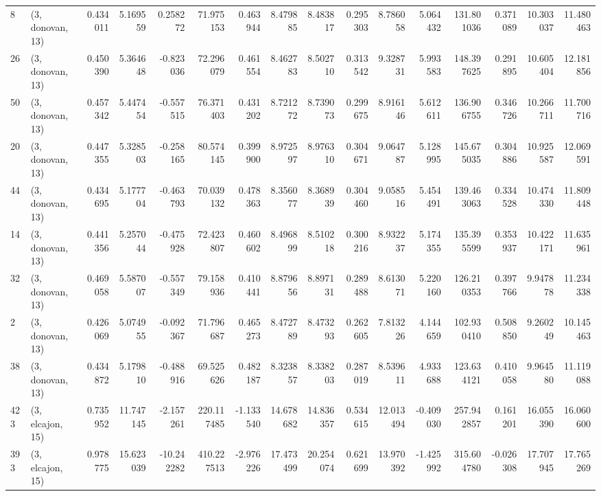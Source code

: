 \begin{tabular}{llrrrrrrrrrrrrrr}
8   &  (3, donovan, 13) &   0.434011 &   5.169559 &   0.258272 &    71.975153 &   0.463944 &   8.479885 &   8.483817 &  0.295303 &   8.786058 &   5.064432 &   131.801036 &   0.371089 &  10.303037 &  11.480463 \\
26  &  (3, donovan, 13) &   0.450390 &   5.364648 &  -0.823036 &    72.296079 &   0.461554 &   8.462783 &   8.502710 &  0.313542 &   9.328731 &   5.993583 &   148.397625 &   0.291895 &  10.605404 &  12.181856 \\
50  &  (3, donovan, 13) &   0.457342 &   5.447454 &  -0.557515 &    76.371403 &   0.431202 &   8.721272 &   8.739073 &  0.299675 &   8.916146 &   5.612611 &   136.906755 &   0.346726 &  10.266711 &  11.700716 \\
20  &  (3, donovan, 13) &   0.447355 &   5.328503 &  -0.258165 &    80.574145 &   0.399900 &   8.972597 &   8.976310 &  0.304671 &   9.064787 &   5.128995 &   145.675035 &   0.304886 &  10.925587 &  12.069591 \\
44  &  (3, donovan, 13) &   0.434695 &   5.177704 &  -0.463793 &    70.039132 &   0.478363 &   8.356077 &   8.368939 &  0.304460 &   9.058516 &   5.454491 &   139.463063 &   0.334528 &  10.474330 &  11.809448 \\
14  &  (3, donovan, 13) &   0.441356 &   5.257044 &  -0.475928 &    72.423807 &   0.460602 &   8.496899 &   8.510218 &  0.300216 &   8.932237 &   5.174355 &   135.395599 &   0.353937 &  10.422171 &  11.635961 \\
32  &  (3, donovan, 13) &   0.469058 &   5.587007 &  -0.557349 &    79.158936 &   0.410441 &   8.879656 &   8.897131 &  0.289488 &   8.613071 &   5.220160 &   126.210353 &   0.397766 &   9.947878 &  11.234338 \\
2   &  (3, donovan, 13) &   0.426069 &   5.074955 &  -0.092367 &    71.796687 &   0.465273 &   8.472789 &   8.473293 &  0.262605 &   7.813226 &   4.144659 &   102.930410 &   0.508850 &   9.260249 &  10.145463 \\
38  &  (3, donovan, 13) &   0.434872 &   5.179810 &  -0.488916 &    69.525626 &   0.482187 &   8.323857 &   8.338203 &  0.287019 &   8.539611 &   4.933688 &   123.634121 &   0.410058 &   9.964580 &  11.119088 \\
423 &  (3, elcajon, 15) &   0.735952 &  11.747145 &  -2.157261 &   220.117485 &  -1.133540 &  14.678682 &  14.836357 &  0.534615 &  12.013494 &  -0.409030 &   257.942857 &   0.161201 &  16.055390 &  16.060600 \\
393 &  (3, elcajon, 15) &   0.978775 &  15.623039 & -10.242282 &   410.227513 &  -2.976226 &  17.473499 &  20.254074 &  0.621699 &  13.970392 &  -1.425992 &   315.604780 &  -0.026308 &  17.707945 &  17.765269 \\

\end{tabular}
